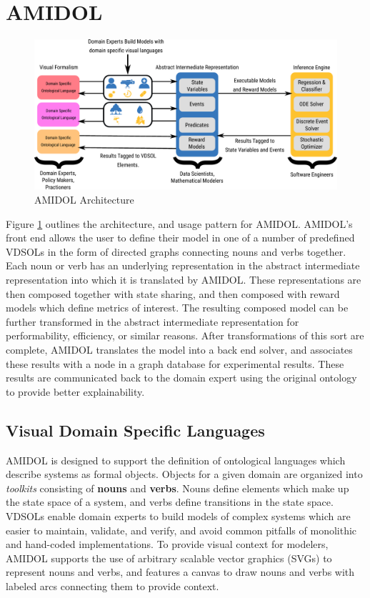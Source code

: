 \documentclass[11pt]{article}
\newcommand{\amidol}{\textsc{AMIDOL}}
\begin{document}
\section{AMIDOL}

\begin{figure}
  \includegraphics[width=\textwidth]{figs/system-architecture-quad.pdf}
  \caption{\amidol{} Architecture}
  \label{Fig:Architecture}
\end{figure}

Figure \ref{Fig:Architecture} outlines the architecture, and usage pattern for \amidol{}.  \amidol{}'s front end allows the user to define their model in one of a number of predefined VDSOLs in the form of directed graphs connecting nouns and verbs together.  Each noun or verb has an underlying representation in the abstract intermediate representation into which it is translated by \amidol{}.  These representations are then composed together with state sharing, and then composed with reward models which define metrics of interest.  The resulting composed model can be further transformed in the abstract intermediate representation for performability, efficiency, or similar reasons.  After transformations of this sort are complete, \amidol{} translates the model into a back end solver, and associates these results with a node in a graph database for experimental results.  These results are communicated back to the domain expert using the original ontology to provide better explainability.

\subsection{Visual Domain Specific Languages}

\amidol{} is designed to support the definition of ontological languages which describe systems as formal objects.  Objects for a given domain are organized into \emph{toolkits} consisting of \textbf{nouns} and \textbf{verbs}.  Nouns define elements which make up the state space of a system, and verbs define transitions in the state space.  VDSOLs enable domain experts to build models of complex systems which are easier to maintain, validate, and verify, and avoid common pitfalls of monolithic and hand-coded implementations.  To provide visual context for modelers, \amidol{} supports the use of arbitrary scalable vector graphics (SVGs) to represent nouns and verbs, and features a canvas to draw nouns and verbs with labeled arcs connecting them to provide context.
\end{document}
